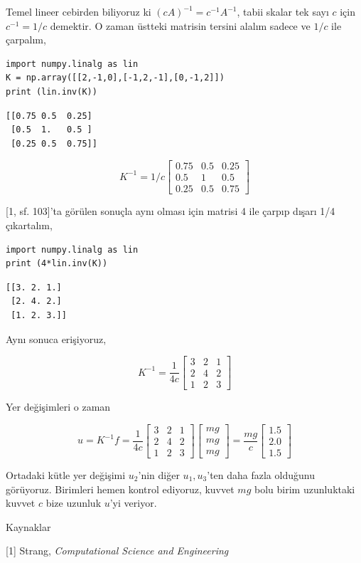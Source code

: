 \documentclass[12pt,fleqn]{article}\usepackage{../../common}
\begin{document}
Temel lineer cebirden biliyoruz ki $(cA)^{-1} = c^{-1} A^{-1}$, tabii
skalar tek sayı $c$ için $c^{-1} = 1/c$ demektir. O zaman üstteki matrisin
tersini alalım sadece ve $1/c$ ile çarpalım,

\begin{verbatim}
import numpy.linalg as lin
K = np.array([[2,-1,0],[-1,2,-1],[0,-1,2]])
print (lin.inv(K))
\end{verbatim}

\begin{verbatim}
[[0.75 0.5  0.25]
 [0.5  1.   0.5 ]
 [0.25 0.5  0.75]]
\end{verbatim}

$$ K^{-1} = 1/c
\left[\begin{array}{rrr}
0.75   &     0.5 &       0.25 \\
0.5       & 1 &     0.5 \\
0.25         & 0.5     &      0.75
\end{array}\right]
$$

[1, sf. 103]'ta görülen sonuçla aynı olması için matrisi 4 ile çarpıp dışarı
1/4 çıkartalım,

\begin{verbatim}
import numpy.linalg as lin
print (4*lin.inv(K))
\end{verbatim}

\begin{verbatim}
[[3. 2. 1.]
 [2. 4. 2.]
 [1. 2. 3.]]
\end{verbatim}

Aynı sonuca erişiyoruz,

$$ K^{-1} = \frac{1}{4c}
\left[\begin{array}{rrr}
3 & 2 & 1 \\ 2 & 4 & 2 \\ 1 & 2 & 3
\end{array}\right]
$$

Yer değişimleri o zaman 

$$
u = K^{-1} f = \frac{1}{4c}
\left[\begin{array}{rrr}
3 & 2 & 1 \\ 2 & 4 & 2 \\ 1 & 2 & 3
\end{array}\right]
\left[\begin{array}{r}
mg \\ mg \\ mg
\end{array}\right] =
\frac{mg}{c}
\left[\begin{array}{r}
1.5 \\ 2.0 \\ 1.5
\end{array}\right]
$$

Ortadaki kütle yer değişimi $u_2$'nin diğer $u_1,u_3$'ten daha fazla olduğunu
görüyoruz. Birimleri hemen kontrol ediyoruz, kuvvet $mg$ bolu birim uzunluktaki
kuvvet $c$ bize uzunluk $u$'yi veriyor. 





Kaynaklar

[1] Strang, {\em Computational Science and Engineering}
\end{document}

